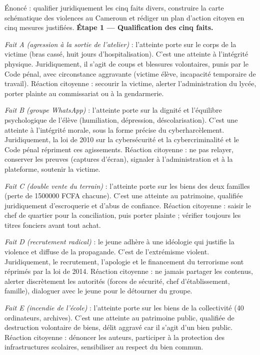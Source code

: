 \documentclass[11pt]{article}
\newcommand{\cle}[1]{{\popxbold\color{popdark}#1}}
\begin{document}
\begin{exoresolu}
Énoncé : qualifier juridiquement les cinq faits divers, construire la carte schématique des violences au Cameroun et rédiger un plan d'action citoyen en cinq mesures justifiées.
\tcblower
\textbf{Étape 1 — Qualification des cinq faits.}\par
\emph{Fait A (agression à la sortie de l'atelier)} : l'atteinte porte sur le corps de la victime (bras cassé, huit jours d'hospitalisation). C'est une \cle{atteinte à l'intégrité physique}. Juridiquement, il s'agit de coups et blessures volontaires, punis par le Code pénal, avec circonstance aggravante (victime élève, incapacité temporaire de travail). Réaction citoyenne : secourir la victime, alerter l'administration du lycée, porter plainte au commissariat ou à la gendarmerie.\par
\emph{Fait B (groupe WhatsApp)} : l'atteinte porte sur la dignité et l'équilibre psychologique de l'élève (humiliation, dépression, déscolarisation). C'est une \cle{atteinte à l'intégrité morale}, sous la forme précise du cyberharcèlement. Juridiquement, la loi de 2010 sur la cybersécurité et la cybercriminalité et le Code pénal répriment ces agissements. Réaction citoyenne : ne pas relayer, conserver les preuves (captures d'écran), signaler à l'administration et à la plateforme, soutenir la victime.\par
\emph{Fait C (double vente du terrain)} : l'atteinte porte sur les biens des deux familles (perte de \num{1500000} FCFA chacune). C'est une \cle{atteinte au patrimoine}, qualifiée juridiquement d'escroquerie et d'abus de confiance. Réaction citoyenne : saisir le chef de quartier pour la conciliation, puis porter plainte ; vérifier toujours les titres fonciers avant tout achat.\par
\emph{Fait D (recrutement radical)} : le jeune adhère à une idéologie qui justifie la violence et diffuse de la propagande. C'est de l'\cle{extrémisme violent}. Juridiquement, le recrutement, l'apologie et le financement du terrorisme sont réprimés par la loi de 2014. Réaction citoyenne : ne jamais partager les contenus, alerter discrètement les autorités (forces de sécurité, chef d'établissement, famille), dialoguer avec le jeune pour le détourner du groupe.\par
\emph{Fait E (incendie de l'école)} : l'atteinte porte sur les biens de la collectivité (40 ordinateurs, archives). C'est une \cle{atteinte au patrimoine public}, qualifiée de destruction volontaire de biens, délit aggravé car il s'agit d'un bien public. Réaction citoyenne : dénoncer les auteurs, participer à la protection des infrastructures scolaires, sensibiliser au respect du bien commun.\par

\end{exoresolu}
\end{document}
